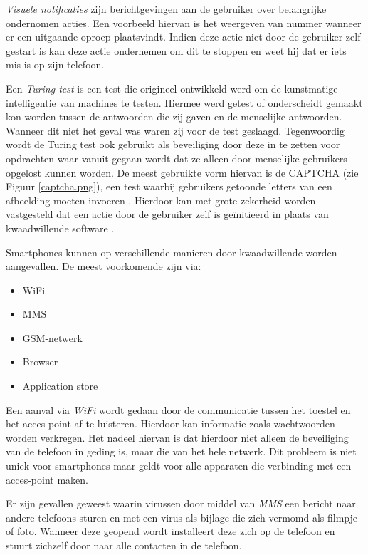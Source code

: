 \emph{Visuele notificaties} zijn berichtgevingen aan de gebruiker over belangrijke ondernomen acties. Een voorbeeld hiervan is het weergeven van nummer wanneer er een uitgaande oproep plaatsvindt. Indien deze actie niet door de gebruiker zelf gestart is kan deze actie ondernemen om dit te stoppen en weet hij dat er iets mis is op zijn telefoon. 

Een \emph{Turing test} is een test die origineel ontwikkeld werd om de kunstmatige intelligentie van machines te testen. Hiermee werd getest of onderscheidt gemaakt kon worden tussen de antwoorden die zij gaven en de menselijke antwoorden. Wanneer dit niet het geval was waren zij voor de test geslaagd. Tegenwoordig wordt de Turing test ook gebruikt als beveiliging door deze in te zetten voor opdrachten waar vanuit gegaan wordt dat ze alleen door menselijke gebruikers opgelost kunnen worden. De meest gebruikte vorm hiervan is de CAPTCHA (zie Figuur \ref{captcha.png}), een test waarbij gebruikers getoonde letters van een afbeelding moeten invoeren \citep{von2003captcha}. Hierdoor kan met grote zekerheid worden vastgesteld dat een actie door de gebruiker zelf is ge\"initieerd in plaats van kwaadwillende software \citep{becher2011mobile}. 

Smartphones kunnen op verschillende manieren door kwaadwillende worden aangevallen. De meest voorkomende zijn via:

\begin{itemize}
   \item WiFi
   \item MMS
   \item GSM-netwerk
   \item Browser
   \item Application store
\end{itemize}

Een aanval via \emph{WiFi} wordt gedaan door de communicatie tussen het toestel en het acces-point af te luisteren. Hierdoor kan informatie zoals wachtwoorden worden verkregen. Het nadeel hiervan is dat hierdoor niet alleen de beveiliging van de telefoon in geding is, maar die van het hele netwerk. Dit probleem is niet uniek voor smartphones maar geldt voor alle apparaten die verbinding met een acces-point maken.

Er zijn gevallen geweest waarin virussen door middel van \emph{MMS} een bericht naar andere telefoons sturen en met een virus als bijlage die zich vermomd als filmpje of foto. Wanneer deze geopend wordt installeert deze zich op de telefoon en stuurt zichzelf door naar alle contacten in de telefoon. 

